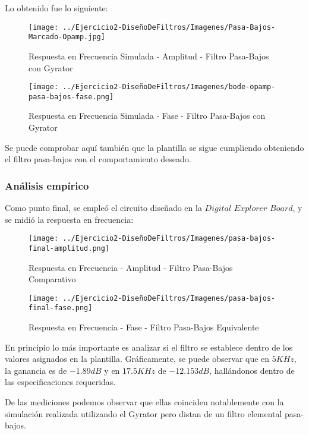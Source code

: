 Lo obtenido fue lo siguiente:

\begin{figure}[H]
    \centering
    \texttt{[image: ../Ejercicio2-DiseñoDeFiltros/Imagenes/Pasa-Bajos-Marcado-Opamp.jpg]}
    \caption{Respuesta en Frecuencia Simulada - Amplitud - Filtro Pasa-Bajos con Gyrator}
\end{figure}

\begin{figure}[H]
    \centering
    \texttt{[image: ../Ejercicio2-DiseñoDeFiltros/Imagenes/bode-opamp-pasa-bajos-fase.png]}
    \caption{Respuesta en Frecuencia Simulada - Fase - Filtro Pasa-Bajos con Gyrator}
\end{figure}

Se puede comprobar aquí también que la plantilla se sigue cumpliendo obteniendo el filtro pasa-bajos con el comportamiento deseado.

\subsubsection{Análisis empírico}

Como punto final, se empleó el circuito diseñado en la $Digital$ $Explorer$ $Board$, y se midió la respuesta en frecuencia:

\begin{figure}[H]
    \centering
    \texttt{[image: ../Ejercicio2-DiseñoDeFiltros/Imagenes/pasa-bajos-final-amplitud.png]}
    \caption{Respuesta en Frecuencia - Amplitud - Filtro Pasa-Bajos Comparativo}
\end{figure}

\begin{figure}[H]
    \centering
    \texttt{[image: ../Ejercicio2-DiseñoDeFiltros/Imagenes/pasa-bajos-final-fase.png]}
    \caption{Respuesta en Frecuencia - Fase - Filtro Pasa-Bajos Equivalente}
\end{figure}


En principio lo más importante es analizar si el filtro se establece dentro de los valores asignados en la plantilla. Gráficamente, se puede observar
que en $5 KHz$, la ganancia es de $-1.89 dB$ y en $17.5 KHz$ de $-12.153 dB$, hallándonos dentro de las especificaciones requeridas.

De las mediciones podemos observar que ellas coinciden notablemente con la simulación realizada utilizando el Gyrator pero distan de un filtro elemental pasa-bajos.


